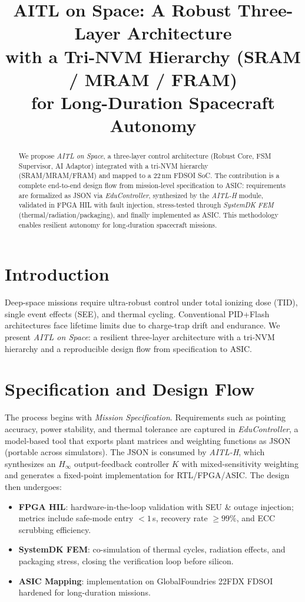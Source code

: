 \documentclass[conference]{IEEEtran}
\title{AITL on Space: A Robust Three-Layer Architecture\\
with a Tri-NVM Hierarchy (SRAM / MRAM / FRAM)\\
for Long-Duration Spacecraft Autonomy}
\author{
\IEEEauthorblockN{Shinichi Samizo}
\IEEEauthorblockA{Independent Semiconductor Researcher\\
Former Engineer at Seiko Epson Corporation\\
Email: shin3t72@gmail.com\quad GitHub: \url{https://github.com/Samizo-AITL}}
}
\begin{document}
\maketitle

\begin{abstract}
We propose \emph{AITL on Space}, a three-layer control architecture (Robust Core, FSM Supervisor, AI Adaptor) integrated with a tri-NVM hierarchy (SRAM/MRAM/FRAM) and mapped to a 22\,nm FD\!SOI SoC. The contribution is a complete end-to-end design flow from mission-level specification to ASIC: requirements are formalized as JSON via \emph{EduController}, synthesized by the \emph{AITL-H} module, validated in FPGA HIL with fault injection, stress-tested through \emph{SystemDK FEM} (thermal/radiation/packaging), and finally implemented as ASIC. This methodology enables resilient autonomy for long-duration spacecraft missions.
\end{abstract}

\section{Introduction}
Deep-space missions require ultra-robust control under total ionizing dose (TID), single event effects (SEE), and thermal cycling. Conventional PID+Flash architectures face lifetime limits due to charge-trap drift and endurance. We present \emph{AITL on Space}: a resilient three-layer architecture with a tri-NVM hierarchy and a reproducible design flow from specification to ASIC.

\section{Specification and Design Flow}
The process begins with \emph{Mission Specification}. Requirements such as pointing accuracy, power stability, and thermal tolerance are captured in \emph{EduController}, a model-based tool that exports plant matrices and weighting functions as JSON (portable across simulators). The JSON is consumed by \emph{AITL-H}, which synthesizes an $H_\infty$ output-feedback controller $K$ with mixed-sensitivity weighting and generates a fixed-point implementation for RTL/FPGA/ASIC. The design then undergoes:
\begin{itemize}
  \item \textbf{FPGA HIL}: hardware-in-the-loop validation with SEU \& outage injection; metrics include safe-mode entry $<\!1$\,s, recovery rate $\ge\!99\%$, and ECC scrubbing efficiency.
  \item \textbf{SystemDK FEM}: co-simulation of thermal cycles, radiation effects, and packaging stress, closing the verification loop before silicon.
  \item \textbf{ASIC Mapping}: implementation on GlobalFoundries 22FDX FD\!SOI hardened for long-duration missions.
\end{itemize}
\end{document}
